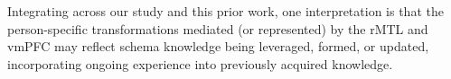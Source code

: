 \documentclass{article}
\begin{document}
Integrating across our study and this prior work, one interpretation is that the person-specific transformations mediated (or represented) by the rMTL and vmPFC may reflect schema knowledge being leveraged, formed, or updated, incorporating ongoing experience into previously acquired knowledge.
\end{document}
